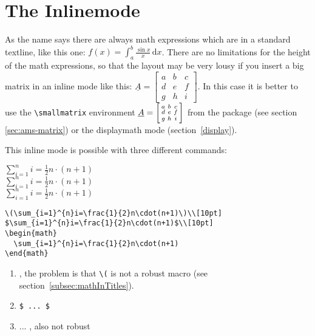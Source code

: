 \section{The Inlinemode}\label{sec:The-Inlinemode}
As the name says there are always math expressions which are in a standard
textline, like this one: $f(x)=\int_{a}^{b}\frac{\sin x}{x}\,\mathrm{d}x$. There
are no limitations for the height of the math expressions, so that
the layout may be very lousy if you insert a big matrix in an inline mode
like this:
$\underline{A}=\left[\begin{array}{ccc}
a & b & c\\
d & e & f\\
g & h & i\end{array}\right]$. In this case it is better to use the \verb|\smallmatrix| environment
$\underline{A}=\left[\begin{smallmatrix}%
a & b & c\cr
d & e & f\cr
g & h & i\end{smallmatrix}\right]$ from the \AmSmath{} package (see section \vref{sec:ams-matrix}) or the
displaymath mode (section~\vref{display}).

This inline mode is possible with three different commands:

\bigskip
\begin{minipage}{0.35\fullwidth}
\(\sum_{i=1}^{n}i=\frac{1}{2}n\cdot(n+1)\)\\[10pt]
$\sum_{i=1}^{n}i=\frac{1}{2}n\cdot(n+1)$\\[10pt]
\begin{math}
  \sum_{i=1}^{n}i=\frac{1}{2}n\cdot(n+1)
\end{math}
\end{minipage}\hfill
\begin{minipage}{0.62\fullwidth}
\begin{lstlisting}
\(\sum_{i=1}^{n}i=\frac{1}{2}n\cdot(n+1)\)\\[10pt]
$\sum_{i=1}^{n}i=\frac{1}{2}n\cdot(n+1)$\\[10pt]
\begin{math}
  \sum_{i=1}^{n}i=\frac{1}{2}n\cdot(n+1)
\end{math}
\end{lstlisting}
\end{minipage}

\begin{enumerate}
\item {}\CMD{)}     , the problem is that \verb+\(+ is 
not a robust macro (see section~\vref{subsec:mathInTitles}).
\item \verb+$ ... $+   
\item {} ... , also not robust%
\end{enumerate}

